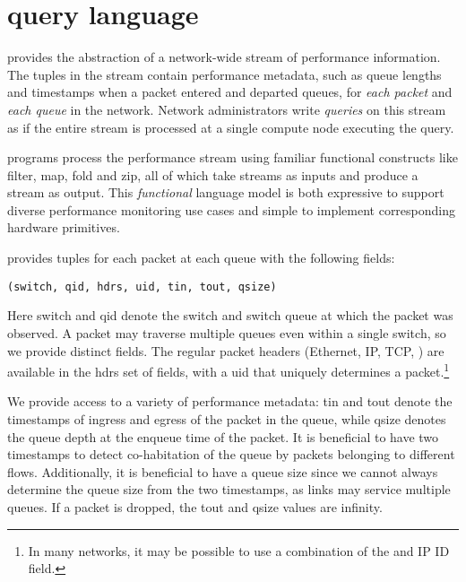 \section{\THESYSTEM query language}
\label{sec:language}
\TheSystem provides the abstraction of a network-wide stream of performance
information. The tuples in the stream contain performance metadata, such as
queue lengths and timestamps when a packet entered and departed queues, for {\em
  each packet} and {\em each queue} in the network. Network administrators write
{\em queries} on this stream as if the entire stream is processed at a single
compute node executing the query.

\TheSystem programs process the performance stream using familiar functional
constructs like {\ct filter}, {\ct map}, {\ct fold} and {\ct zip}, all of which
take streams as inputs and produce a stream as output. This {\em functional}
language model is both expressive to support diverse performance monitoring use
cases and simple to implement corresponding hardware primitives.

 \TheSystem provides tuples for each packet at
each queue with the following fields:
\begin{lstlisting}
(switch, qid, hdrs, uid, tin, tout, qsize)
\end{lstlisting}
Here {\ct switch} and {\ct qid} denote the switch and switch queue at which the
packet was observed. A packet may traverse multiple queues even within a single
switch, so we provide distinct fields. The regular packet headers (Ethernet, IP,
TCP, \etc) are available in the {\ct hdrs} set of fields, with a {\ct uid} that
uniquely determines a packet.\footnote{In many networks, it may be possible to
  use a combination of the \txtftuple and IP ID field.}

We provide access to a variety of performance metadata: {\ct tin} and {\ct tout}
denote the timestamps of ingress and egress of the packet in the queue, while
{\ct qsize} denotes the queue depth at the enqueue time of the packet. It is
beneficial to have two timestamps to detect co-habitation of the queue by
packets belonging to different flows. Additionally, it is beneficial to have a
queue size since we cannot always determine the queue size from the two
timestamps, as links may service multiple queues. If a packet
is dropped, the {\ct tout} and {\ct qsize} values are {\ct infinity.}

